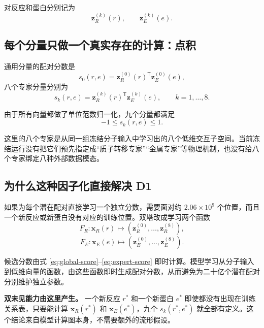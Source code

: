 \documentclass[UTF8,11pt,a4paper]{ctexart}
\begin{document}
对反应和蛋白分别记为
\begin{equation}
\bm z_R^{(k)}(r),\qquad \bm z_E^{(k)}(e).
\end{equation}

\subsection{每个分量只做一个真实存在的计算：点积}

通用分量的配对分数是
\begin{equation}
s_0(r,e)=
\bm z_R^{(0)}(r)^{\mathsf T}
\bm z_E^{(0)}(e),
\label{eq:global-score}
\end{equation}
八个专家分量分别为
\begin{equation}
s_k(r,e)=
\bm z_R^{(k)}(r)^{\mathsf T}
\bm z_E^{(k)}(e),
\qquad k=1,\ldots,8.
\label{eq:expert-score}
\end{equation}

由于所有向量都做了单位范数归一化，九个分量都满足
\begin{equation}
-1\le s_k(r,e)\le1.
\label{eq:component-bound}
\end{equation}

这里的八个专家是从同一组冻结分子输入中学习出的八个低维交互子空间。当前冻结运行没有把它们预先指定成“质子转移专家”“金属专家”等物理机制，也没有给八个专家绑定八种外部数据模态。

\subsection{为什么这种因子化直接解决 D1}

如果为每个潜在配对直接学习一个独立分数，需要面对约 $2.06\times10^9$ 个位置，而且一个新反应或新蛋白没有对应的训练位置。双塔改成学习两个函数
\begin{equation}
F_R:\bm x_R(r)\mapsto
\left(\bm z_R^{(0)},\ldots,\bm z_R^{(8)}\right),
\end{equation}
\begin{equation}
F_E:\bm x_E(e)\mapsto
\left(\bm z_E^{(0)},\ldots,\bm z_E^{(8)}\right).
\end{equation}

候选分数由式 \eqref{eq:global-score}--\eqref{eq:expert-score} 即时计算。模型学习从分子输入到低维向量的函数，由这些函数即时生成配对分数，从而避免为二十亿个潜在配对分别维护独立参数。

\begin{keybox}
\textbf{双未见能力由这里产生。} 一个新反应 $r^*$ 和一个新蛋白 $e^*$ 即使都没有出现在训练关系表，只要能计算 $\bm x_R(r^*)$ 和 $\bm x_E(e^*)$，九个 $s_k(r^*,e^*)$ 就全部有定义。这个结论来自模型计算图本身，不需要额外的流形假设。
\end{keybox}
\end{document}
